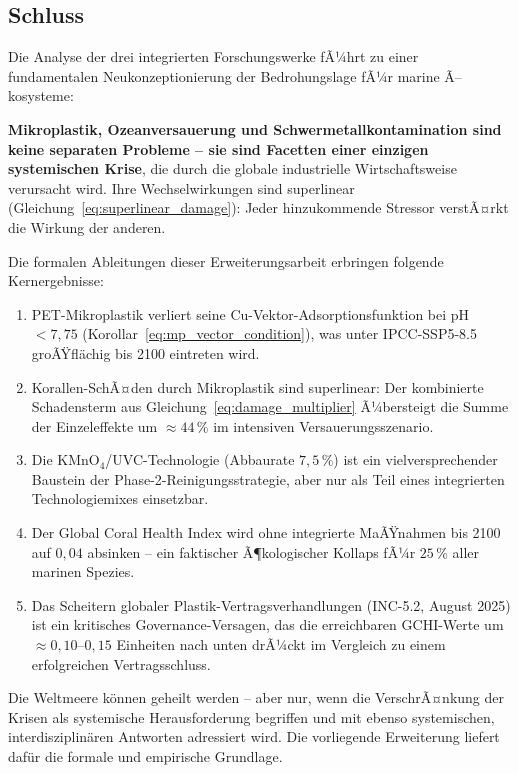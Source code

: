 ﻿\documentclass[12pt,a4paper]{article}
\theoremstyle{definition}
\theoremstyle{remark}
\newcommand{\MP}{Mikroplastik}
\begin{document}
\subsection{Schluss}
\label{subsec:schluss}

Die Analyse der drei integrierten Forschungswerke fÃ¼hrt zu einer fundamentalen
Neukonzeptionierung der Bedrohungslage fÃ¼r marine Ã–kosysteme:

\textbf{Mikroplastik, Ozeanversauerung und Schwermetallkontamination sind keine
separaten Probleme -- sie sind Facetten einer einzigen systemischen Krise}, die durch
die globale industrielle Wirtschaftsweise verursacht wird. Ihre Wechselwirkungen
sind superlinear (Gleichung~\eqref{eq:superlinear_damage}): Jeder hinzukommende
Stressor verstÃ¤rkt die Wirkung der anderen.

Die formalen Ableitungen dieser Erweiterungsarbeit erbringen folgende
Kernergebnisse:
\begin{enumerate}[leftmargin=*, label=\textbf{K\arabic*.}]
  \item PET-Mikroplastik verliert seine Cu-Vektor-Adsorptionsfunktion bei
    pH~$< 7{,}75$ (Korollar~\ref{eq:mp_vector_condition}), was unter
    IPCC-SSP5-8.5 groÃŸfl\"achig bis 2100 eintreten wird.
  \item Korallen-SchÃ¤den durch \MP{} sind superlinear: Der kombinierte
    Schadensterm aus Gleichung~\eqref{eq:damage_multiplier} Ã¼bersteigt die
    Summe der Einzeleffekte um ${\approx}44\,\%$ im intensiven
    Versauerungsszenario.
  \item Die KMnO$_4$/UVC-Technologie (Abbaurate $7{,}5\,\%$) ist ein
    vielversprechender Baustein der Phase-2-Reinigungsstrategie,
    aber nur als Teil eines integrierten Technologiemixes einsetzbar.
  \item Der Global Coral Health Index wird ohne integrierte MaÃŸnahmen
    bis 2100 auf $0{,}04$ absinken -- ein faktischer Ã¶kologischer Kollaps
    fÃ¼r $25\,\%$ aller marinen Spezies.
  \item Das Scheitern globaler Plastik-Vertragsverhandlungen (INC-5.2, August 2025)
    ist ein kritisches Governance-Versagen, das die erreichbaren GCHI-Werte
    um $\approx 0{,}10$--$0{,}15$ Einheiten nach unten drÃ¼ckt im Vergleich
    zu einem erfolgreichen Vertragsschluss.
\end{enumerate}

Die Weltmeere k\"onnen geheilt werden -- aber nur, wenn die VerschrÃ¤nkung der
Krisen als systemische Herausforderung begriffen und mit ebenso systemischen,
interdisziplin\"aren Antworten adressiert wird.
Die vorliegende Erweiterung liefert daf\"ur die formale und empirische Grundlage.
\end{document}
